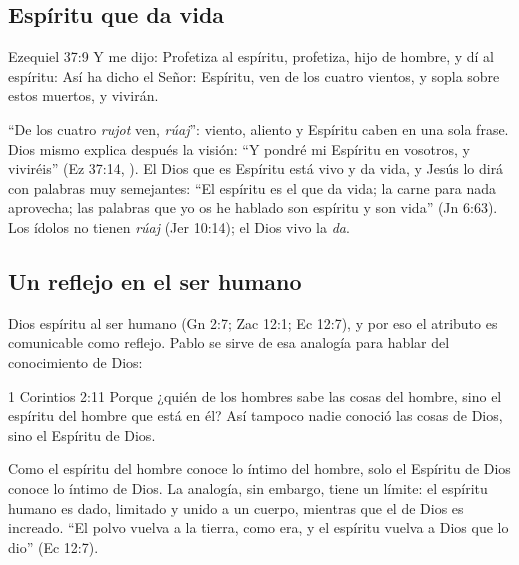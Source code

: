 
\subsection{Espíritu que da vida}

\begin{verso}{Ezequiel 37:9}
Y me dijo: Profetiza al espíritu, profetiza, hijo de hombre, y dí al espíritu: Así ha dicho \SENOR{} el Señor: Espíritu, ven de los cuatro vientos, y sopla sobre estos muertos, y vivirán.
\end{verso}

``De los cuatro \emph{rujot} ven, \emph{rúaj}'': viento, aliento y Espíritu caben en una sola frase. Dios mismo explica después la visión: ``Y pondré mi Espíritu en vosotros, y viviréis'' (Ez 37:14, ). El Dios que es Espíritu está vivo y da vida, y Jesús lo dirá con palabras muy semejantes: ``El espíritu es el que da vida; la carne para nada aprovecha; las palabras que yo os he hablado son espíritu y son vida'' (Jn 6:63). Los ídolos no tienen \emph{rúaj} (Jer 10:14); el Dios vivo la \emph{da}.

\subsection{Un reflejo en el ser humano}

Dios  espíritu al ser humano (Gn 2:7; Zac 12:1; Ec 12:7), y por eso el atributo es comunicable como reflejo. Pablo se sirve de esa analogía para hablar del conocimiento de Dios:

\begin{verso}{1 Corintios 2:11}
Porque ¿quién de los hombres sabe las cosas del hombre, sino el espíritu del hombre que está en él? Así tampoco nadie conoció las cosas de Dios, sino el Espíritu de Dios.
\end{verso}

Como el espíritu del hombre conoce lo íntimo del hombre, solo el Espíritu de Dios conoce lo íntimo de Dios. La analogía, sin embargo, tiene un límite: el espíritu humano es dado, limitado y unido a un cuerpo, mientras que el de Dios es increado. ``El polvo vuelva a la tierra, como era, y el espíritu vuelva a Dios que lo dio'' (Ec 12:7).


